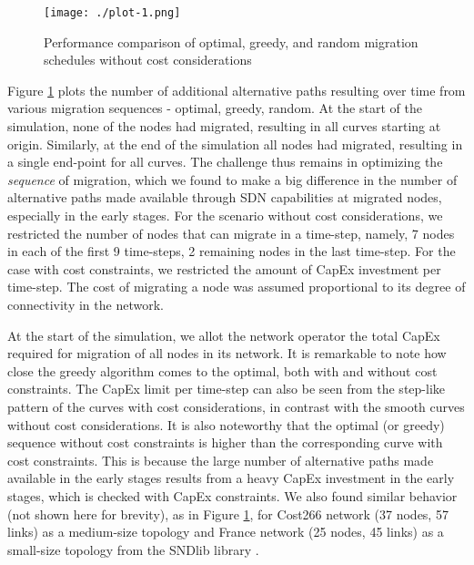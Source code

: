 \documentclass[conference]{IEEEtran}
\begin{document}
\begin{figure}
\begin{center}
\texttt{[image: ./plot-1.png]}
\caption{Performance comparison of optimal, greedy, and random migration
schedules without cost considerations}
\label{fig:number of migrated nodes}
\end{center}
\vspace{-7mm}
\end{figure}

\par Figure \ref{fig:number of migrated nodes} plots the number of additional
alternative paths resulting over time from various migration sequences -
optimal, greedy, random. At the start of the simulation, none of the nodes had
migrated, resulting in all curves starting at origin.
Similarly, at the end of the simulation all nodes had migrated, resulting in a
single end-point for all curves. The challenge thus remains in optimizing the
\emph{sequence} of migration, which we found to make a big difference in
the number of alternative paths made available through SDN capabilities at
migrated nodes, especially in the early stages. For the scenario without cost
considerations, we restricted the number of nodes that can migrate in a
time-step, namely, 7 nodes in each of the first 9 time-steps, 2 remaining nodes in the
last time-step. For the case with cost constraints, we restricted the amount of
CapEx investment per time-step. The cost of migrating a node was assumed proportional to its degree of
connectivity in the network.

\par At the start of the simulation, we allot the network operator the total CapEx
required for migration of all nodes in its network. It is remarkable to note how
close the greedy algorithm comes to the optimal, both with and without cost
constraints. The CapEx limit per time-step can also be seen from the step-like
pattern of the curves with cost considerations, in contrast with the smooth
curves without cost considerations. It is also noteworthy that the optimal (or
greedy) sequence without cost constraints is higher than the corresponding
curve with cost constraints. This is because the large number of alternative
paths made available in the early stages results from a heavy CapEx investment
in the early stages, which is checked with CapEx constraints. We also found
similar behavior (not shown here for brevity), as in Figure \ref{fig:number of migrated nodes}, for Cost266
network (37 nodes, 57 links) as a medium-size topology and
France network (25 nodes, 45 links) as a small-size topology
from the SNDlib library \cite{sndlib}. 
\end{document}
